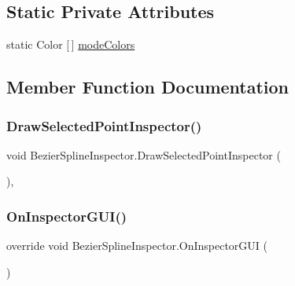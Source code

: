 \subsection*{Static Private Attributes}
\begin{DoxyCompactItemize}
\item 
static Color \mbox{[}$\,$\mbox{]} \hyperlink{classBezierSplineInspector_a20cbc0fdf235b0b9e2d349def79ba333}{mode\+Colors}
\end{DoxyCompactItemize}


\subsection{Member Function Documentation}
\mbox{\label{classBezierSplineInspector_a9301f0b079b6a96ff147231bb6af0bfe}} 
\subsubsection{\texorpdfstring{Draw\+Selected\+Point\+Inspector()}{DrawSelectedPointInspector()}}
{\footnotesize\ttfamily void Bezier\+Spline\+Inspector.\+Draw\+Selected\+Point\+Inspector (\begin{DoxyParamCaption}{ }\end{DoxyParamCaption})\hspace{0.3cm}{\ttfamily [inline]}, {\ttfamily [private]}}

\mbox{\label{classBezierSplineInspector_a3232a5fd28ba98bf7b5d4aa170546f31}} 
\subsubsection{\texorpdfstring{On\+Inspector\+G\+U\+I()}{OnInspectorGUI()}}
{\footnotesize\ttfamily override void Bezier\+Spline\+Inspector.\+On\+Inspector\+G\+UI (\begin{DoxyParamCaption}{ }\end{DoxyParamCaption})\hspace{0.3cm}{\ttfamily [inline]}}

